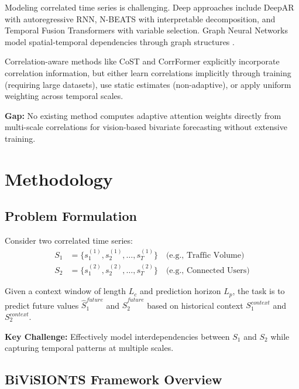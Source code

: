 \documentclass[preprint,12pt,authoryear]{elsarticle}
\begin{document}
Modeling correlated time series is challenging. Deep approaches include DeepAR \citep{salinas2020} with autoregressive RNN, N-BEATS \citep{oreshkin2020} with interpretable decomposition, and Temporal Fusion Transformers \citep{lim2021} with variable selection. Graph Neural Networks model spatial-temporal dependencies through graph structures \citep{li2018dcrnn,wu2019graph}.

Correlation-aware methods like CoST \citep{woo2022cost} and CorrFormer explicitly incorporate correlation information, but either learn correlations implicitly through training (requiring large datasets), use static estimates (non-adaptive), or apply uniform weighting across temporal scales.

\textbf{Gap:} No existing method computes adaptive attention weights directly from multi-scale correlations for vision-based bivariate forecasting without extensive training.

\section{Methodology}
\label{sec:methodology}

\subsection{Problem Formulation}

Consider two correlated time series:
\begin{align}
    S_1 &= \{s_1^{(1)}, s_2^{(1)}, \ldots, s_T^{(1)}\} \quad \text{(e.g., Traffic Volume)} \\
    S_2 &= \{s_1^{(2)}, s_2^{(2)}, \ldots, s_T^{(2)}\} \quad \text{(e.g., Connected Users)}
\end{align}

Given a context window of length $L_c$ and prediction horizon $L_p$, the task is to predict future values $\hat{S}_1^{future}$ and $\hat{S}_2^{future}$ based on historical context $S_1^{context}$ and $S_2^{context}$.

\textbf{Key Challenge:} Effectively model interdependencies between $S_1$ and $S_2$ while capturing temporal patterns at multiple scales.

\subsection{BiViSIONTS Framework Overview}
\end{document}
